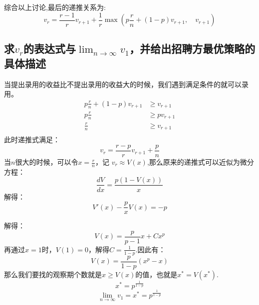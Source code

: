\documentclass{ctexart}
\begin{document}
综合以上讨论,最后的递推关系为:
\begin{equation}
    v_r = \frac{r-1}{r} v_{r+1} + \frac{1}{r} \max \left( p\frac{r}{n} + (1-p)v_{r+1}, \quad v_{r+1} \right)
\end{equation}
\subsection{求$v_r$的表达式与$\displaystyle{\lim_{n \to \infty}v_1}$，并给出招聘方最优策略的具体描述}
当提出录用的收益比不提出录用的收益大的时候，我们遇到满足条件的就可以录用。
\begin{equation}
    \begin{aligned}
        p\frac{r}{n} + (1-p)v_{r+1} & \ge v_{r+1}   \\
        p\frac{r}{n}                & \ge p v_{r+1} \\
        \frac{r}{n}                 & \ge v_{r+1}   \\
    \end{aligned}
\end{equation}
此时递推式满足：
\begin{equation}
    v_r = \frac{r-p}{r} v_{r+1} + \frac{p}{n}
\end{equation}
当$n$很大的时候，可以令$x = \frac{r}{n}$，记 $v_r \approx V(x)$,那么原来的递推式可以近似为微分方程：
\begin{equation}
    \frac{dV}{dx} = \frac{p(1 - V(x))}{x}
\end{equation}
解得：
\begin{equation}
    V'(x) - \frac{p}{x}V(x) = -p
\end{equation}

解得：
\begin{equation}
    V(x) = \frac{p}{p-1}x + C x^p
\end{equation}
再通过$x = 1$时，$V(1) = 0$，解得$C = \frac{1}{1-p}$.因此有：
\begin{equation}
    V(x) = \frac{p}{1-p}(x^p - x)
\end{equation}
那么我们要找的观察期个数就是$x \ge V(x)$的值，也就是$x^* = V(x^*)$.
\begin{equation}
    x^* = p^{\frac{1}{1-p}}
\end{equation}
\begin{equation}
    \lim_{n \to \infty} v_1 = x^* = p^{\frac{1}{1-p}}
\end{equation}
\end{document}
